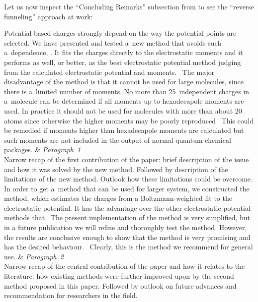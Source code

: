 \documentclass[12pt, a4paper, oneside]{article}
\newlength{\smalllinespacing}
\renewcommand{\caps}[1]{{\textscale{0.97}{\textls[50]{\MakeUppercase{#1}}}}}
\theoremstyle{Plain}
\theoremstyle{Definition}
\theoremstyle{Remark}
\begin{document}
Let us now inspect the ``Concluding Remarks'' subsection from \citet{sigfridsson} to see the ``reverse funneling'' approach at work:
\begin{tcolorbox}
	\begin{tblr}{}
		Potential-based charges strongly depend on the way the potential points are selected. We have presented and tested a~new method that avoids such a~dependence, \caps{CHELMO}. It fits the charges directly to the electrostatic moments and it performs as well, or better, as the best electrostatic potential method judging from the calculated electrostatic potential and moments. \textellipsis\ The major disadvantage of the method is that it cannot be used for large molecules, since there is a~limited number of moments. No more than 25~independent charges in a~molecule can be determined if all moments up to hexadecapole moments are used. In practice it should not be used for molecules with more than about 20 atoms since otherwise the higher moments may be poorly reproduced \textellipsis\ This could be remedied if moments higher than hexadecapole moments are calculated but such moments are not included in the output of normal quantum chemical packages.
		&
		{%
			\textit{Paragraph~1} \\
			Narrow recap of the first contribution of the paper: brief description of the issue and how it was solved by the new method. Followed by description of the limitations of the new method. Outlook how these limitations could be overcome.
		}
		\\
		\hspace{\smalllinespacing}In order to get a~method that can be used for larger system, we constructed the \caps{CHELP-BOW} method, which estimates the charges from a Boltzmann-weighted fit to the electrostatic potential. It has the advantage over the other electrostatic potential methods that \textellipsis\ The present implementation of the \caps{CHELP-BOW} method is very simplified, but in a future publication we will refine and thoroughly test the method. However, the results are conclusive enough to show that the method is very promising and has the desired behaviour. \textellipsis\ Clearly, this is the method we recommend for general use.
		&
		{%
			\textit{Paragraph~2} \\
			Narrow recap of the central contribution of the paper and how it relates to the literature: how existing methods were further improved upon by the second method proposed in this paper. Followed by outlook on future advances and recommendation for researchers in the field.
}
\end{tblr}
\end{tcolorbox}
\end{document}
